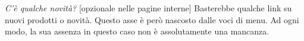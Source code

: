 \textit{C'è qualche novità?} [opzionale nelle pagine interne]\newline
Basterebbe qualche link su nuovi prodotti o novità. Questo asse è però nascosto dalle voci di menu. Ad ogni modo, la sua assenza in questo caso non è assolutamente una mancanza.